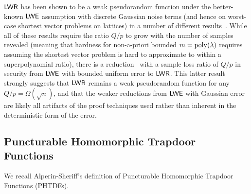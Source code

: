 $\mathsf{LWR}$ has been shown to be a weak pseudorandom function under the
better-known $\mathsf{LWE}$ assumption with discrete Gaussian noise terms (and hence on worst-case shortest
vector problems on lattices) in a number of different results~\cite{DBLP:conf/eurocrypt/BanerjeePR12,DBLP:conf/crypto/AlwenKPW13,cryptoeprint:2016:589,DBLP:conf/tcc/BogdanovGMRR16,DBLP:conf/asiacrypt/BaiLLSS15}. While
all of these results require the ratio $Q/p$ to grow with the number
of samples revealed (meaning that hardness for non-a-priori bounded
$m=\operatorname{poly}(\lambda)$ requires assuming the shortest vector problem is hard
to approximate to within a superpolynomial ratio), there is a
reduction~\cite{DBLP:conf/tcc/BogdanovGMRR16} with a sample loss ratio of $Q/p$ in
security from $\mathsf{LWE}$ with bounded uniform error to $\mathsf{LWR}$. This latter result
strongly suggests that $\mathsf{LWR}$ remains a weak pseudorandom function
for any $Q/p=\Omega(\sqrt{n})$, and that the weaker reductions from
$\mathsf{LWE}$ with Gaussian error are likely all artifacts of the proof
techniques used rather than inherent in the deterministic form of the
error. 

\subsection{Puncturable Homomorphic Trapdoor Functions}
\label{sec:punct-homom-trapd}
We recall Alperin-Sheriff's definition of Puncturable Homomorphic
Trapdoor Functions (PHTDFs). 

